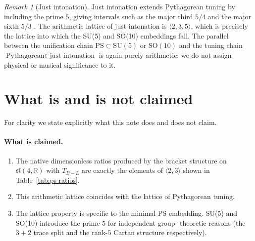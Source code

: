 \documentclass[11pt]{article}
\theoremstyle{plain}
\theoremstyle{remark}
\newtheorem*{remark}{Remark}
\newcommand{\sln}[1]{\mathfrak{sl}(#1,\mathbb{R})}
\newcommand{\TBL}{T_{B\!-\!L}}
\begin{document}
\begin{remark}[Just intonation]
Just intonation extends Pythagorean tuning by including the prime
$5$, giving intervals such as the major third $5/4$ and the major
sixth $5/3$ \cite{Barker1989, Sethares2004}.  The arithmetic lattice
of just intonation is $\langle 2, 3, 5 \rangle$, which is precisely
the lattice into which the SU(5) and SO(10) embeddings fall.  The
parallel between the unification chain
$\mathrm{PS} \subset \mathrm{SU}(5)$ or $\mathrm{SO}(10)$
and the tuning chain $\text{Pythagorean} \subset \text{just intonation}$
is again purely arithmetic; we do not assign physical or musical
significance to it.
\end{remark}

\section{What is and is not claimed}

For clarity we state explicitly what this note does and does not
claim.

\paragraph{What is claimed.}
\begin{enumerate}\itemsep0pt
  \item The native dimensionless ratios produced by the bracket
    structure on $\sln{4}$ with $\TBL$ are exactly the elements of
    $\langle 2, 3 \rangle$ shown in Table~\ref{tab:ps-ratios}.
  \item This arithmetic lattice coincides with the lattice of
    Pythagorean tuning.
  \item The lattice property is specific to the minimal PS embedding.
    SU(5) and SO(10) introduce the prime $5$ for independent group-
    theoretic reasons (the $3+2$ trace split and the rank-$5$
    Cartan structure respectively).
\end{enumerate}
\end{document}
